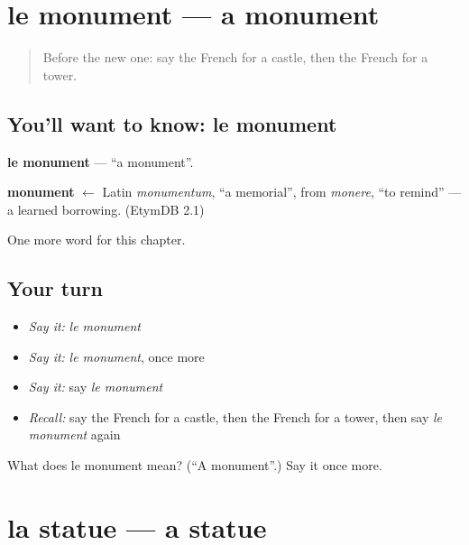 \section[le monument]{le monument — a monument}

\label{lesson:FR-C170-monument}



\begin{quote}
Before the new one: say the French for a castle, then the French for a tower.
\end{quote}

\subsection*{You'll want to know: le monument}
\textbf{le monument} — \textquotedblleft{}a monument\textquotedblright{}.

\begin{cousinweb}
\textbf{monument} $\leftarrow$ Latin \emph{monumentum}, \textquotedblleft{}a memorial\textquotedblright{}, from \emph{monere}, \textquotedblleft{}to remind\textquotedblright{} — a learned borrowing. (EtymDB 2.1)
\end{cousinweb}

\begin{grammarlens}[title={What you've built}]
One more word for this chapter.
\end{grammarlens}

\subsection*{Your turn}
\begin{itemize}
\raggedright
  \item \emph{Say it:} \emph{le monument}
  \item \emph{Say it:} \emph{le monument}, once more
  \item \emph{Say it:} say \emph{le monument}
  \item \emph{Recall:} say the French for a castle, then the French for a tower, then say \emph{le monument} again
\end{itemize}

\begin{tcolorbox}[breakable,colback=teal!4,colframe=teal!35!black,title={Before you move on}]
What does le monument mean? (\textquotedblleft{}A monument\textquotedblright{}.) Say it once more.
\end{tcolorbox}
\section[la statue]{la statue — a statue}

